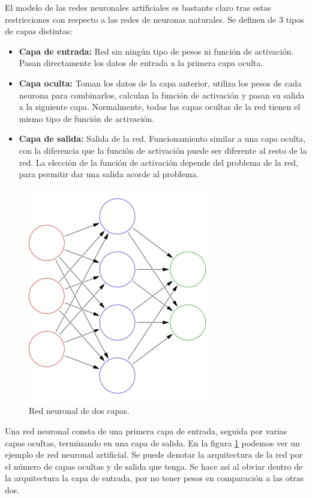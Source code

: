 El modelo de las redes neuronales artificiales es bastante claro tras estas restricciones con respecto a las redes de neuronas naturales. Se definen de 3 tipos de capas distintas:
\begin{itemize}
\item \textbf{Capa de entrada:} Red sin ningún tipo de pesos ni función de activación. Pasan directamente los datos de entrada a la primera capa oculta.
\item \textbf{Capa oculta:} Toman los datos de la capa anterior, utiliza los pesos de cada neurona para combinarlos, calculan la función de activación y pasan su salida a la siguiente capa. Normalmente, todas las capas ocultas de la red tienen el mismo tipo de función de activación.
\item \textbf{Capa de salida:} Salida de la red. Funcionamiento similar a una capa oculta, con la diferencia que la función de activación puede ser diferente al resto de la red. La elección de la función de activación depende del problema de la red, para permitir dar una salida acorde al problema.
\end{itemize}

\begin{figure}
\begin{center}

\includegraphics[scale=0.5]{img/NN.png}
\end{center}

\caption{Red neuronal de dos capas.}
\label{NN}
\end{figure}

Una red neuronal consta de una primera capa de entrada, seguida por varias capas ocultas, terminando en una capa de salida. En la figura \ref{NN} podemos ver un ejemplo de red neuronal artificial. Se puede denotar la arquitectura de la red por el número de capas ocultas y de salida que tenga. Se hace así al obviar dentro de la arquitectura la capa de entrada, por no tener pesos en comparación a las otras dos.\\

